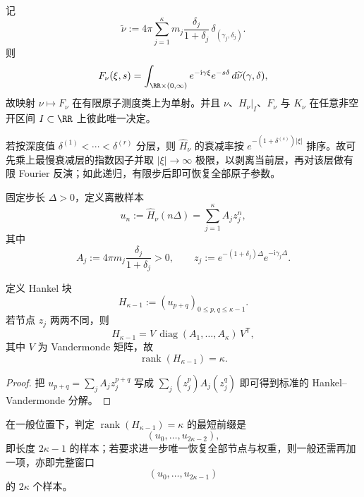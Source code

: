 \begin{proposition}[二维指纹的张量分解与唯一性]\label{prop:unit-circle-comoving-fingerprint-uniqueness}
记
\[
\widetilde\nu:=
4\pi\sum_{j=1}^{\kappa}
m_j\frac{\delta_j}{1+\delta_j}\,\delta_{(\gamma_j,\delta_j)}.
\]
则
\[
F_\nu(\xi,s)
=
\int_{\RR\times(0,\infty)}
e^{-\mathrm{i}\gamma\xi}e^{-s\delta}\,d\widetilde\nu(\gamma,\delta),
\]
故映射 \(\nu\mapsto F_\nu\) 在有限原子测度类上为单射。并且 \(\nu\)、\(H_\nu|_I\)、\(F_\nu\) 与 \(K_\nu\) 在任意非空开区间 \(I\subset\RR\) 上彼此唯一决定。
\end{proposition}

\begin{remark}[递归层剥离]\label{rem:unit-circle-comoving-layer-peeling}
若按深度值 \(\delta^{(1)}<\cdots<\delta^{(r)}\) 分层，则 \(\widehat H_\nu\) 的衰减率按 \(e^{-(1+\delta^{(s)})|\xi|}\) 排序。故可先乘上最慢衰减层的指数因子并取 \(|\xi|\to\infty\) 极限，以剥离当前层，再对该层做有限 Fourier 反演；如此递归，有限步后即可恢复全部原子参数。
\end{remark}

\begin{definition}[等距频谱样本与指数节点]\label{def:unit-circle-comoving-discrete-samples}
固定步长 \(\Delta>0\)，定义离散样本
\[
u_n:=\widehat H_\nu(n\Delta)
=\sum_{j=1}^{\kappa}A_j z_j^n,
\]
其中
\[
A_j:=4\pi m_j\frac{\delta_j}{1+\delta_j}>0,
\qquad
z_j:=e^{-(1+\delta_j)\Delta}e^{-\mathrm{i}\gamma_j\Delta}.
\]
\end{definition}

\begin{proposition}\label{prop:unit-circle-comoving-hankel-factorization}
定义 Hankel 块
\[
H_{\kappa-1}:=(u_{p+q})_{0\le p,q\le \kappa-1}.
\]
若节点 \(z_j\) 两两不同，则
\[
H_{\kappa-1}=V\,\operatorname{diag}(A_1,\dots,A_\kappa)\,V^{\mathsf T},
\]
其中 \(V\) 为 Vandermonde 矩阵，故
\[
\operatorname{rank}(H_{\kappa-1})=\kappa.
\]
\end{proposition}
\begin{proof}
把 \(u_{p+q}=\sum_j A_j z_j^{p+q}\) 写成
\(
\sum_j (z_j^p)A_j(z_j^q)
\)
即可得到标准的 Hankel--Vandermonde 分解。
\end{proof}

\begin{theorem}[Prony 门槛]\label{thm:unit-circle-comoving-prony-threshold}
在一般位置下，判定 \(\operatorname{rank}(H_{\kappa-1})=\kappa\) 的最短前缀是
\[
(u_0,\dots,u_{2\kappa-2}),
\]
即长度 \(2\kappa-1\) 的样本；若要求进一步唯一恢复全部节点与权重，则一般还需再加一项，亦即完整窗口
\[
(u_0,\dots,u_{2\kappa-1})
\]
的 \(2\kappa\) 个样本。
\end{theorem}

